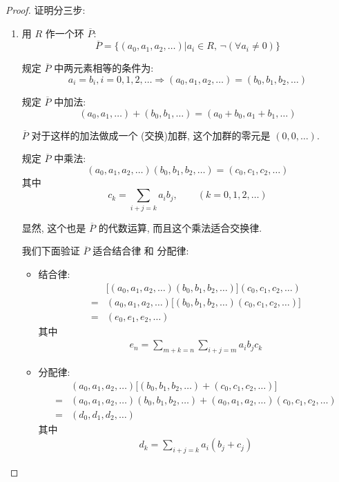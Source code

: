 \documentclass[utf8]{ctexbook}
\begin{document}
\begin{proof}
证明分三步:
\begin{enumerate}
\item{用 $R$ 作一个环 $\overline{P}$: 
\begin{equation}
\overline{P} = \{ (a_0, a_1, a_2, \ldots) | a_i \in R, \, \lnot (\forall a_i \neq 0) \} \nonumber
\end{equation}

规定 $\overline{P}$ 中两元素相等的条件为:
\begin{equation}
a_i = b_i , i = 0, 1, 2, \ldots \Longrightarrow (a_0, a_1, a_2, \ldots ) = (b_0, b_1, b_2, \ldots ) \nonumber
\end{equation}

规定 $\overline{P}$ 中加法:
\begin{equation}
(a_0, a_1, \ldots ) + (b_0, b_1, \ldots ) = (a_0 + b_0 , a_1 + b_1, \ldots ) \nonumber
\end{equation}

$\overline{P}$ 对于这样的加法做成一个 (交换)加群, 这个加群的零元是 $(0,0,\ldots)$.

规定 $\overline{P}$ 中乘法:
\begin{equation}
(a_0, a_1, a_2, \ldots ) (b_0, b_1, b_2, \ldots ) = (c_0, c_1, c_2, \ldots) \nonumber
\end{equation}
其中
\begin{equation}
c_k = \sum_{i+j = k} a_i b_j ,\quad \quad (k=0,1,2, \ldots) \nonumber
\end{equation}

显然, 这个也是 $\overline{P}$ 的代数运算, 而且这个乘法适合交换律.

我们下面验证 $\overline{P}$ 适合结合律 和 分配律:
\begin{itemize}
\item{结合律: 
\begin{align*}
& \big[(a_0, a_1, a_2, \ldots)(b_0, b_1, b_2, \ldots)\big](c_0, c_1, c_2, \ldots) \\
= & (a_0, a_1, a_2, \ldots)\big[(b_0, b_1, b_2, \ldots)(c_0, c_1, c_2, \ldots)\big] \\
= & (e_0, e_1, e_2, \ldots)
\end{align*}
其中
\begin{align*}
e_n = \sum_{m+k = n} \sum_{i+j=m} a_i b_j c_k
\end{align*}

}
\item{分配律:
\begin{align*}
& (a_0, a_1, a_2, \ldots)\big[ (b_0, b_1, b_2, \ldots) + (c_0, c_1, c_2, \ldots) \big]\\
= &  (a_0, a_1, a_2, \ldots)  (b_0, b_1, b_2, \ldots) + (a_0, a_1, a_2, \ldots)  (c_0, c_1, c_2, \ldots) \\
= & (d_0, d_1, d_2, \ldots)
\end{align*}
其中
\begin{align*}
d_k = \sum_{i+j=k} a_i (b_j + c_j)
\end{align*}
}
\end{itemize}

}
\end{enumerate}
\end{proof}
\end{document}
